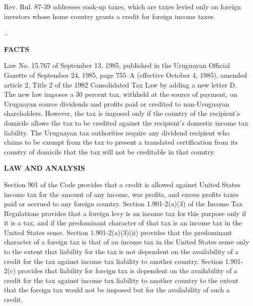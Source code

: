  Rev. Rul. 87-39 addresses soak-up taxes, which are taxes levied only on foreign investors whose home country grants a credit for foreign income taxes. 
 
 
\begin{select}
\ldots\\


\begin{center} \textbf{FACTS}
\end{center}
Law No. 15.767 of September 13, 1985, published in the Uruguayan Official Gazette of September 24, 1985, page 
755--A (effective October 4, 1985), amended article 2, Title 2 of the 1982 Consolidated Tax Law by adding a new letter 
D. The new law imposes a 30 percent tax, withheld at the source of payment, on Uruguayan source dividends and profits 
paid or credited to non-Uruguayan shareholders. However, the tax is imposed only if the country of the recipient's 
domicile allows the tax to be credited against the recipient's domestic income tax liability. The Uruguayan tax authorities 
require any dividend recipient who claims to be exempt from the tax to present a translated certification from its country 
of domicile that the tax will not be creditable in that country.
\begin{center} \textbf{LAW AND ANALYSIS}
\end{center}
 Section 901 of the Code provides that a credit is allowed against United States income tax for the amount of any 
income, war profits, and excess profits taxes paid or accrued to any foreign country. Section 1.901-2(a)(3) of the Income 
Tax Regulations provides that a foreign levy is an income tax for this purpose only if it is a tax, and if the predominant 
character of that tax is an income tax in the United States sense. Section 1.901-2(a)(3)(ii) provides that the predominant 
character of a foreign tax is that of an income tax in the United States sense only to the extent that liability for the tax is 
not dependent on the availability of a credit for the tax against income tax liability to another country. Section 1.901-2(c) 
provides that liability for foreign tax is dependent on the availability of a credit for the tax against income tax liability to 
another country to the extent that the foreign tax would not be imposed but for the availability of such a credit. 


\end{select}
